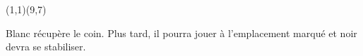 \documentclass[preview, border=0pt, varwidth=false]{standalone}
\begin{document}
	\setgounit{0.6cm} 
	
	\parbox[c][14.65cm][c]{10.2cm}{
			\centering
		\begin{psgopartialboard}{(1,1)(9,7)}
			\pass
		\end{psgopartialboard}
		
		\vspace{1em}
		Blanc récupère le coin. Plus tard, il pourra jouer à l'emplacement marqué et noir devra se stabiliser.
	}
	
\end{document}
